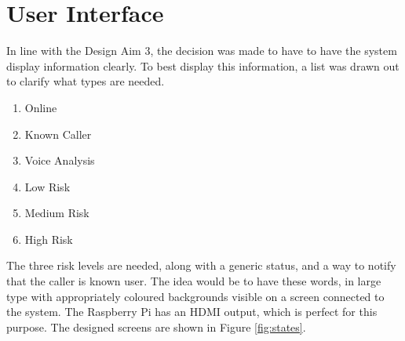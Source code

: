 \documentclass[main.tex]{subfiles}
\begin{document}
\section{User Interface}
In line with the Design Aim 3, the decision was made to have to have the system display information clearly. To best display this information, a list was drawn out to clarify what types are needed.

\begin{enumerate}
	\item Online
	\item Known Caller
	\item Voice Analysis
	\item Low Risk
	\item Medium Risk
	\item High Risk
\end{enumerate}

The three risk levels are needed, along with a generic status, and a way to notify that the caller is known user. The idea would be to have these words, in large type with appropriately coloured backgrounds visible on a screen connected to the system. The Raspberry Pi has an HDMI output, which is perfect for this purpose. The designed screens are shown in Figure \ref{fig:states}.
\end{document}
